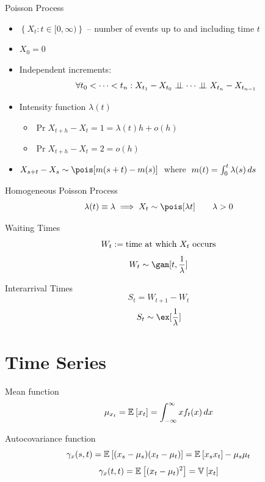 \documentclass[landscape]{article}
\begin{document}
\begin{multicols*}{2}
Poisson Process
\begin{itemize}
  \item $\left\{ X_t : t \in [0,\infty) \right\}$
    -- number of events up to and including time $t$
  \item $X_0 = 0$ 
  \item Independent increments: 
    $$\forall t_0 < \cdots < t_n:
    X_{t_1} - X_{t_0} \perp\!\!\!\perp \cdots \perp\!\!\!\perp X_{t_n} - X_{t_{n-1}}$$
  \item Intensity function $\lambda(t)$
    \begin{itemize}
      \item $\Pr{X_{t+h}-X_t = 1} = \lambda(t) h + o(h)$
      \item $\Pr{X_{t+h}-X_t = 2} = o(h)$
    \end{itemize}
  \item $X_{s+t} - X_s \dist \pois[m(s+t)-m(s)]\;$ where
    $\;m(t)=\int_0^t\lambda(s)\,ds$
\end{itemize}

Homogeneous Poisson Process
$$\lambda(t) \equiv \lambda \imp X_t \dist \pois[\lambda t] \qquad \lambda > 0$$

Waiting Times
$$W_t := \text{time at which $X_t$ occurs}$$
$$W_t \dist \gam[t, \frac{1}{\lambda}]$$

Interarrival Times
$$S_t = W_{t+1} - W_t$$
$$S_t \dist \ex[\frac{1}{\lambda}]$$

\begin{center}
\end{center}

\section{Time Series}

Mean function
$$\mu_{x_t} = \mathbb{E}_{}\left[x_t\right] = \int_{-\infty}^\infty x f_t(x) \,dx$$

Autocovariance function
$$\gamma_x(s,t) = \mathbb{E}_{}\left[(x_s-\mu_s)(x_t-\mu_t)\right] = \mathbb{E}_{}\left[x_sx_t\right] - \mu_s\mu_t$$
$$\gamma_x(t,t) = \mathbb{E}_{}\left[(x_t-\mu_t)^2\right] = \mathbb{V}_{}\left[x_t\right]$$


\end{multicols*}
\end{document}
